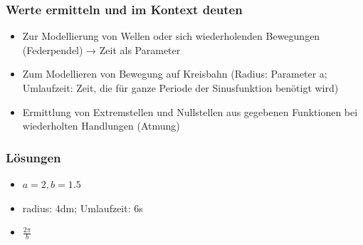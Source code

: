 \documentclass[12pt]{beamer}
\begin{document}
\begin{frame}
  \frametitle{Werte ermitteln und im Kontext deuten}
  \begin{itemize}
    \item Zur Modellierung von Wellen oder sich wiederholenden Bewegungen (Federpendel) → Zeit als Parameter
    \item Zum Modellieren von Bewegung auf Kreisbahn (Radius: Parameter a; Umlaufzeit: Zeit, die für ganze Periode der Sinusfunktion benötigt wird)
    \item Ermittlung von Extremstellen und Nullstellen aus gegebenen Funktionen bei wiederholten Handlungen (Atmung)
  \end{itemize}
\end{frame}
\begin{frame}
  \frametitle{Lösungen}
  \begin{itemize}
    \item $a = 2, b = 1.5$
    \item radius: 4dm; Umlaufzeit: 6s
    \item $\frac{2\pi}{b}$
  \end{itemize}
\end{frame}
\end{document}
